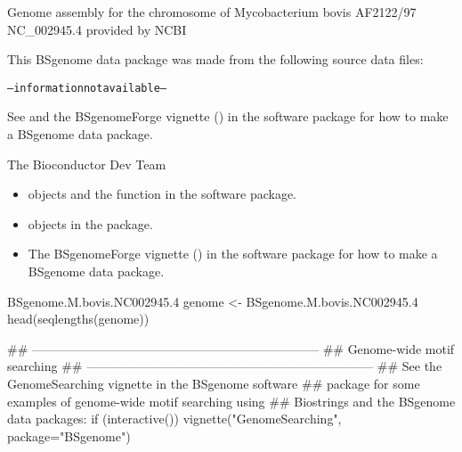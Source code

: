 \documentclass[a4paper]{book}
\begin{document}
%
\begin{Description}\relax
Genome assembly for the chromosome of Mycobacterium bovis AF2122/97 NC\_002945.4 provided by NCBI
\end{Description}
%
\begin{Note}\relax
This BSgenome data package was made from the following source data files:
\begin{alltt}
-- information not available --
  \end{alltt}


See  and the BSgenomeForge
vignette () in the 
software package for how to make a BSgenome data package.
\end{Note}
%
\begin{Author}\relax
The Bioconductor Dev Team
\end{Author}
%
\begin{SeeAlso}\relax
\begin{itemize}

\item {} objects and the
 function
in the  software package.
\item {} objects in the 
package.
\item The BSgenomeForge vignette ()
in the  software package for how to make a BSgenome
data package.

\end{itemize}

\end{SeeAlso}
%
\begin{Examples}
\begin{ExampleCode}
BSgenome.M.bovis.NC002945.4
genome <- BSgenome.M.bovis.NC002945.4
head(seqlengths(genome))


## ---------------------------------------------------------------------
## Genome-wide motif searching
## ---------------------------------------------------------------------
## See the GenomeSearching vignette in the BSgenome software
## package for some examples of genome-wide motif searching using
## Biostrings and the BSgenome data packages:
if (interactive())
    vignette("GenomeSearching", package="BSgenome")
\end{ExampleCode}
\end{Examples}
\printindex{}
\end{document}
